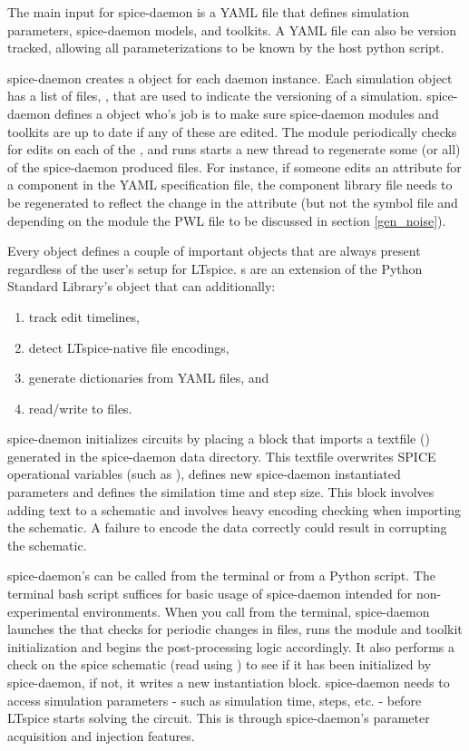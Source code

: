 The main input for spice-daemon is a YAML file that defines simulation parameters, spice-daemon models, and
toolkits. A YAML file can also be version tracked, allowing all parameterizations to be known by the host
python script. 

spice-daemon creates a  object for each daemon instance. Each simulation
object has a list of files, , that are used to indicate the versioning
of a simulation. spice-daemon defines a  object who's job is to make sure
spice-daemon modules and toolkits are up to date if any of these 
are edited. 
The  module periodically checks for edits on each of the ,
and runs starts a new thread to regenerate some (or all) of the spice-daemon produced files.
For instance, if someone edits an attribute for a component in the YAML specification file, 
the component library file needs to be regenerated to reflect the change in the attribute (but not the symbol file and depending on the module the PWL file to be discussed in section \ref{gen_noise}).

Every  object defines a couple of important  objects that are always present regardless
of the user's setup for LTspice. s are an extension of the Python Standard Library's  object that can additionally:
\begin{enumerate}
    \item track edit timelines,
    \item detect LTspice-native file encodings,
    \item generate dictionaries from YAML files, and
    \item read/write to files.
\end{enumerate}

spice-daemon initializes circuits by placing a block that imports a textfile () 
generated
in the spice-daemon data directory. This textfile overwrites SPICE operational variables
(such as ), defines new spice-daemon instantiated parameters and defines the
similation time and step size. This block involves adding text to a schematic and involves
heavy encoding checking when importing the schematic. A failure to encode the data correctly
could result in corrupting the schematic.

spice-daemon's  can be called from the terminal or from a Python script. The terminal
bash script suffices for basic usage of spice-daemon intended for non-experimental environments.
When you call  from the terminal, spice-daemon launches the  that checks for 
periodic changes in files, runs the module and toolkit initialization and begins the post-processing logic
accordingly. It also performs a check on the spice schematic (read using )
to see if it has been initialized
by spice-daemon, if not, it writes a new instantiation block.
spice-daemon needs to access simulation parameters - such as simulation time, steps, etc. -
before LTspice starts solving the circuit. This is through spice-daemon's parameter acquisition and injection 
features. 

